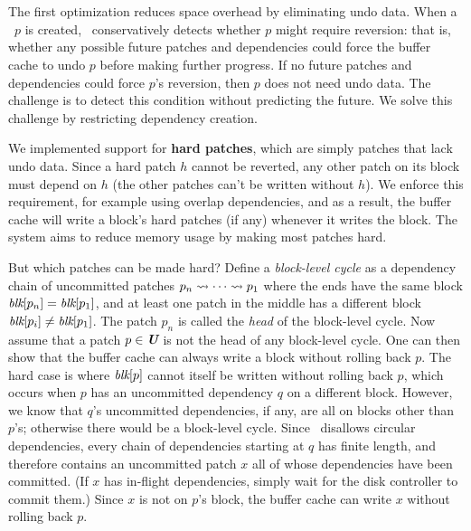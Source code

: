 
\subsection{\Nrb\ \Patches}
\label{sec:patch:nrb}

The first optimization reduces space overhead by
eliminating undo data.
%
When a \patch\ $p$ is created, \Kudos\ conservatively detects whether $p$
 might require reversion:
%
that is, whether any possible future patches and dependencies could force
 the buffer cache to undo $p$ before making further progress.
%
If no future patches and dependencies could force
 $p$'s reversion, then $p$ does not need undo data.
%
The challenge is to detect this condition without predicting the future.
%
We solve this challenge by restricting dependency creation.


We implemented support for \textbf{hard patches}, which are simply patches
 that lack undo data.
%
Since a hard patch $h$ cannot be reverted, any other patch on its block
 must depend on $h$ (the other patches can't be written without $h$).
%
We enforce this requirement, for example using overlap
 dependencies, and
%
as a result, the buffer cache will write a block's hard patches (if any)
 whenever it writes the block.
%
The system aims to reduce memory usage by making most patches hard.


But which patches can be made hard?
%
Define a \emph{block-level cycle} as a dependency chain of uncommitted
 patches $p_n \leadsto \cdots \leadsto p_1$ where the ends have the same
 block $\textit{blk}[{p_n}] = \textit{blk}[{p_1}]$, and at least one patch in the middle
 has a different block $\textit{blk}[{p_i}] \neq \textit{blk}[{p_1}]$.
%
The patch $p_n$ is called the \emph{head} of the block-level cycle.
%
Now assume that a patch $p \in \PMem$ is not the head of any block-level
 cycle.
%
One can then show that the buffer cache can always write a block without
 rolling back $p$.
%
The hard case is where $\textit{blk}[{p}]$ cannot itself be written without
 rolling back $p$, which occurs when $p$ has an uncommitted dependency $q$
 on a different block.
%
However, we know that $q$'s uncommitted dependencies, if any, are all on
 blocks other than $p$'s; otherwise there would be a block-level cycle.
%
Since \Featherstitch\ disallows circular dependencies, every
 chain of dependencies starting at $q$ has finite length, and therefore
 contains an uncommitted patch $x$ all of whose dependencies have
 been committed.
%
(If $x$ has in-flight dependencies, simply wait
 for the disk controller to commit them.)
%
Since $x$ is not on $p$'s block, the buffer cache can write $x$ without
 rolling back $p$.


